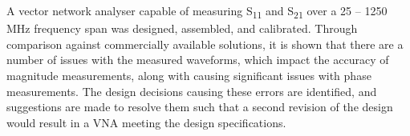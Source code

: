 A vector network analyser capable of measuring S\textsubscript{11} and S\textsubscript{21} over a 25 – 1250 MHz frequency span was designed, assembled, and calibrated. Through comparison against commercially available solutions, it is shown that there are a number of issues with the measured waveforms, which impact the accuracy of magnitude measurements, along with causing significant issues with phase measurements. The design decisions causing these errors are identified, and suggestions are made to resolve them such that a second revision of the design would result in a VNA meeting the design specifications. 
